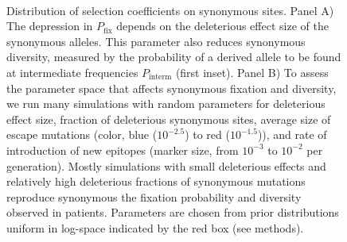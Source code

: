 \documentclass[rmp, twocolumn]{revtex4}
\begin{document}
\begin{figure}
\begin{center}
\\
\caption{Distribution of selection coefficients on synonymous sites. Panel A)
The depression in $P_\text{fix}$ depends on the deleterious effect size 
of the synonymous alleles. This parameter also reduces synonymous
diversity, measured by the probability of a derived allele to be found at
intermediate frequencies $P_\text{interm}$ (first inset).
Panel B) To assess the parameter space that affects synonymous fixation and
diversity, we run many simulations with random parameters for deleterious effect
size, fraction of deleterious synonymous sites, average size of escape
mutations (color, blue ($10^{-2.5}$) to red ($10^{-1.5}$)), and rate of
introduction of new epitopes (marker size, from $10^{-3}$ to $10^{-2}$ per
generation). Mostly simulations with small deleterious effects and relatively
high deleterious fractions of synonymous mutations reproduce synonymous the
fixation probability and diversity observed in patients. Parameters are chosen
from prior distributions uniform in log-space indicated by the red box (see
methods).}
\label{fig:simheat}
\end{center}
\end{figure}
\end{document}
